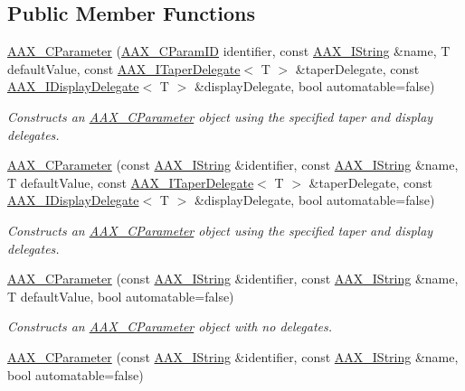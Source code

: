 \subsection*{Public Member Functions}
\begin{DoxyCompactItemize}
\item 
\mbox{\hyperlink{a01537_a37efc08612535de4712bd59445ce8fbf}{A\+A\+X\+\_\+\+C\+Parameter}} (\mbox{\hyperlink{a00392_a1440c756fe5cb158b78193b2fc1780d1}{A\+A\+X\+\_\+\+C\+Param\+ID}} identifier, const \mbox{\hyperlink{a01873}{A\+A\+X\+\_\+\+I\+String}} \&name, T default\+Value, const \mbox{\hyperlink{a01881}{A\+A\+X\+\_\+\+I\+Taper\+Delegate}}$<$ T $>$ \&taper\+Delegate, const \mbox{\hyperlink{a01801}{A\+A\+X\+\_\+\+I\+Display\+Delegate}}$<$ T $>$ \&display\+Delegate, bool automatable=false)
\begin{DoxyCompactList}\small\item\em Constructs an \mbox{\hyperlink{a01537}{A\+A\+X\+\_\+\+C\+Parameter}} object using the specified taper and display delegates. \end{DoxyCompactList}\item 
\mbox{\hyperlink{a01537_a45c6e7e8975b0ab682785b395b80c31f}{A\+A\+X\+\_\+\+C\+Parameter}} (const \mbox{\hyperlink{a01873}{A\+A\+X\+\_\+\+I\+String}} \&identifier, const \mbox{\hyperlink{a01873}{A\+A\+X\+\_\+\+I\+String}} \&name, T default\+Value, const \mbox{\hyperlink{a01881}{A\+A\+X\+\_\+\+I\+Taper\+Delegate}}$<$ T $>$ \&taper\+Delegate, const \mbox{\hyperlink{a01801}{A\+A\+X\+\_\+\+I\+Display\+Delegate}}$<$ T $>$ \&display\+Delegate, bool automatable=false)
\begin{DoxyCompactList}\small\item\em Constructs an \mbox{\hyperlink{a01537}{A\+A\+X\+\_\+\+C\+Parameter}} object using the specified taper and display delegates. \end{DoxyCompactList}\item 
\mbox{\hyperlink{a01537_af91631db027f09bc8918082c842d1719}{A\+A\+X\+\_\+\+C\+Parameter}} (const \mbox{\hyperlink{a01873}{A\+A\+X\+\_\+\+I\+String}} \&identifier, const \mbox{\hyperlink{a01873}{A\+A\+X\+\_\+\+I\+String}} \&name, T default\+Value, bool automatable=false)
\begin{DoxyCompactList}\small\item\em Constructs an \mbox{\hyperlink{a01537}{A\+A\+X\+\_\+\+C\+Parameter}} object with no delegates. \end{DoxyCompactList}\item 
\mbox{\hyperlink{a01537_a3cba283b1eb665a511b400981aecf5e5}{A\+A\+X\+\_\+\+C\+Parameter}} (const \mbox{\hyperlink{a01873}{A\+A\+X\+\_\+\+I\+String}} \&identifier, const \mbox{\hyperlink{a01873}{A\+A\+X\+\_\+\+I\+String}} \&name, bool automatable=false)

\end{DoxyCompactItemize}
